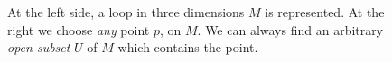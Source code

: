 \begin{figure}[ht]
  \caption{At the left side, a loop in three dimensions $M$ is represented.
    At the right we choose \emph{any} point $p$, on $M$. We can always find an arbitrary
    \emph{open subset} $U$ of $M$ which contains the point.}
  \label{fig:mf-closed-line-3D}
\end{figure}

